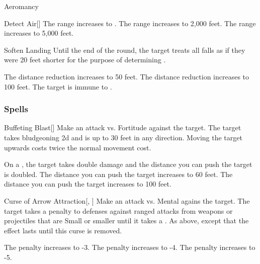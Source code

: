 \begin{spellsection}{Aeromancy}
\begin{freeability}{Detect Air}[]
\rankline
{} The range increases to \rngext.
 The range increases to 2,000 feet.
 The range increases to 5,000 feet.
\end{freeability}


\begin{freeability}{Soften Landing}
Until the end of the round, the target treats all falls as if they were 20 feet shorter for the purpose of determining .

\rankline
{} The distance reduction increases to 50 feet.
 The distance reduction increases to 100 feet.
 The target is immune to .
\end{freeability}

\end{spellsection}


\subsubsection{Spells}


\lowercase{\hypertarget{spell:Buffeting Blast}{}}\label{spell:Buffeting Blast}
\begin{freeability}[Rank 1]{\hypertarget{spell:Buffeting Blast}{Buffeting Blast}}[]
Make an attack vs. Fortitude against the target.
\hit The target takes bludgeoning  \minus2d and is  up to 30 feet in any direction.
Moving the target upwards costs twice the normal movement cost.

\rankline
{} On a , the target takes double damage and the distance you can push the target is doubled.
 The distance you can push the target increases to 60 feet.
 The distance you can push the target increases to 100 feet.
\end{freeability}
\vspace{0.25em}



\lowercase{\hypertarget{spell:Curse of Arrow Attraction}{}}\label{spell:Curse of Arrow Attraction}
\begin{freeability}[Rank 1]{\hypertarget{spell:Curse of Arrow Attraction}{Curse of Arrow Attraction}}[, ]
Make an attack vs. Mental agains the target.
\hit The target takes a  penalty to defenses against  ranged attacks from weapons or projectiles that are Small or smaller until it takes a .
\crit As above, except that the effect lasts until this curse is removed.

\rankline
{} The penalty increases to -3.
 The penalty increases to -4.
 The penalty increases to -5.
\end{freeability}
\vspace{0.25em}




